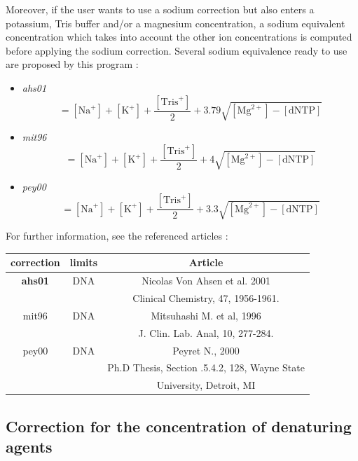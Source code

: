 \documentclass{article}
\begin{document}
Moreover, if the user wants to use a sodium correction but also enters a potassium, Tris buffer
and/or a magnesium concentration, a sodium equivalent concentration which takes into account the other
ion concentrations is computed before applying the sodium correction.
Several sodium equivalence ready to use are proposed by this program :
\begin{itemize}
\item \textit{ahs01}
 \begin{displaymath}
 [\mbox{NaEq}^+]=[\mbox{Na}^+]+[\mbox{K}^+]+\frac{[\mbox{Tris}^+]}{2}+3.79 \sqrt{[\mbox{Mg}^{2+}] - [\mbox{dNTP}]}
 \end{displaymath}
 \item \textit{mit96}
 \begin{displaymath}
 [\mbox{NaEq}^+]=[\mbox{Na}^+]+[\mbox{K}^+]+\frac{[\mbox{Tris}^+]}{2}+4 \sqrt{[\mbox{Mg}^{2+}] - [\mbox{dNTP}]}
 \end{displaymath}
 \item \textit{pey00}
 \begin{displaymath}
 [\mbox{NaEq}^+]=[\mbox{Na}^+]+[\mbox{K}^+]+\frac{[\mbox{Tris}^+]}{2}+3.3 \sqrt{[\mbox{Mg}^{2+}] - [\mbox{dNTP}]}
 \end{displaymath}
\end{itemize}

For further information, see the referenced articles :
\begin{table}[h][c]
\begin{tabular}[h]{| c | c | c |}
\textbf{correction} & \textbf{limits} & \textbf{Article} \\
\hline 
\textbf{ahs01} & DNA & Nicolas Von Ahsen et al. 2001 \\
 & & Clinical Chemistry, 47, 1956-1961. \\
\hline
mit96 & DNA & Mitsuhashi M. et al, 1996 \\
 & & J. Clin. Lab. Anal, 10, 277-284.\\
\hline
pey00 & DNA & Peyret N., 2000 \\
 & & Ph.D Thesis, Section .5.4.2, 128, Wayne State \\
 & & University, Detroit, MI\\
 \hline
\end{tabular}
\end{table}

\subsection{Correction for the concentration of denaturing agents}  
\end{document}
